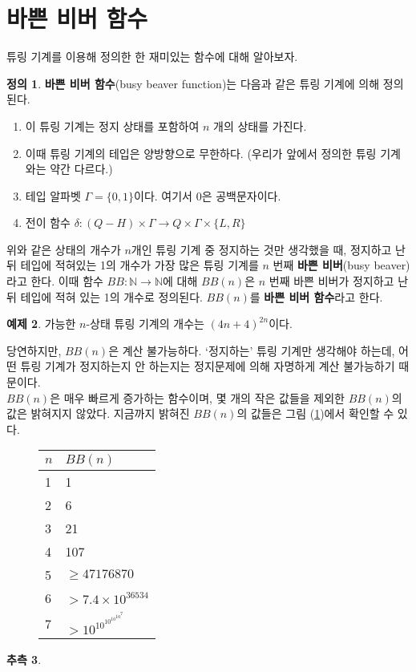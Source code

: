 \documentclass[b5paper, 10pt]{book}
\theoremstyle{definition}
\newtheorem{defn}{정의}[chapter]
\newtheorem{ex}[defn]{예제}
\newtheorem{conj}[defn]{추측}
\begin{document}
\section{바쁜 비버 함수}
튜링 기계를 이용해 정의한 한 재미있는 함수에 대해 알아보자.
\begin{defn}
    \textbf{바쁜 비버 함수}(busy beaver function)는 다음과 같은 튜링 기계에 의해 정의된다.
    \begin{enumerate}
        \item 이 튜링 기계는 정지 상태를 포함하여 $n$ 개의 상태를 가진다.
        \item 이때 튜링 기계의 테입은 양방향으로 무한하다. (우리가 앞에서 정의한 
        튜링 기계와는 약간 다르다.)
        \item 테입 알파벳 $\Gamma = \{0, 1\}$이다. 여기서 0은 공백문자이다.
        \item 전이 함수 $\delta: (Q-H) \times \Gamma \rightarrow Q \times \Gamma \times \{L, R\}$
    \end{enumerate}
    위와 같은 상태의
    개수가 $n$개인 튜링 기계 중 정지하는 것만 생각했을 때, 정지하고 난 뒤 테입에 적혀있는
    1의 개수가 가장 많은 튜링 기계를 $n$ 번째 \textbf{바쁜 비버}(busy beaver)라고 한다. 이때
    함수 $BB: \mathbb{N} \rightarrow \mathbb{N}$에 대해 $BB(n)$은 $n$ 번째 바쁜 비버가 
    정지하고 난 뒤 테입에 적혀 있는 1의 개수로 정의된다. $BB(n)$를 \textbf{바쁜 비버 함수}라고 한다.
\end{defn}
\begin{ex}
    가능한 $n$-상태 튜링 기계의 개수는 $(4n+4)^{2n}$이다.
\end{ex}
당연하지만, $BB(n)$은 계산 불가능하다. `정지하는' 튜링 기계만 생각해야 하는데, 어떤
튜링 기계가 정지하는지 안 하는지는 정지문제에 의해 자명하게 계산 불가능하기 때문이다. \\ 
$BB(n)$은 매우 빠르게 증가하는 함수이며, 몇 개의 작은 값들을 제외한 $BB(n)$의 값은
밝혀지지 않았다. 지금까지 밝혀진 $BB(n)$의 값들은 그림 (\ref{BB table})에서 확인할 수 있다.
\begin{figure}[!ht]
    \centering 
    \begin{tabular}{|l|l|}
        \hline
        $n$ & $BB(n)$        \\ \hline
        1   & 1              \\ \hline
        2   & 6              \\ \hline
        3   & 21             \\ \hline
        4   & 107            \\ \hline
        5   & $\ge 47176870$ \\ \hline
        6   &  $> 7.4 \times 10^{36534}$           \\ \hline
        7   &   $> 10^{10^{10^{10^{10^7}}}}$             \\ \hline
        \end{tabular}
    \caption{}
    \label{BB table}
\end{figure}
\begin{conj}
    
\end{conj}
\end{document}
